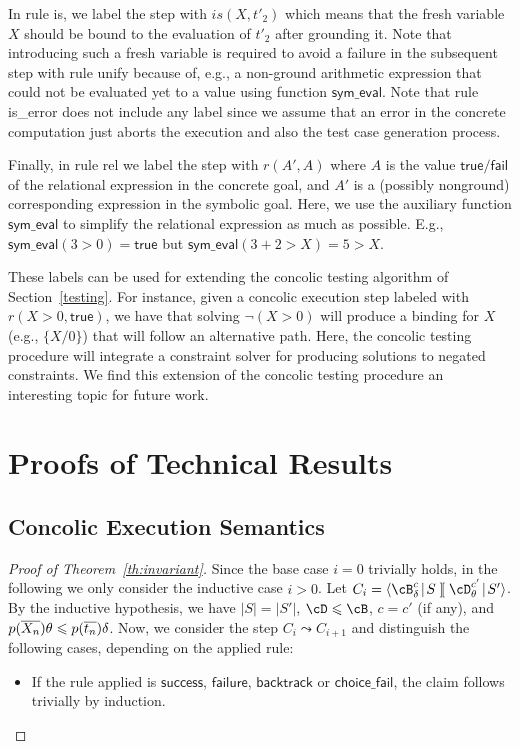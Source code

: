 \documentclass[fleqn]{tlp}
\newcommand{\sleq}{\leqslant}
\newcommand{\true}{\mathsf{true}}
\newcommand{\fail}{\mathsf{fail}}
\newcommand{\midd}{\!\mid\!}
\newcommand{\sep}{\mathit{\;]\![\;}}
\def \tuple#1{\langle #1 \rangle}
\begin{document}
\begin{appendix}
In rule \textsf{is}, we label the step with $is(X,t'_2)$ which means
that the fresh variable $X$ should be bound to the evaluation of
$t'_2$ after grounding it. Note that introducing such a fresh variable
is required to avoid a failure in the subsequent step with rule
\textsf{unify} because of, e.g., a non-ground arithmetic expression
that could not be evaluated yet to a value using function
$\mathsf{sym\_eval}$.
Note that rule \textsf{is\_error} does not include any label since we
assume that an error in the concrete computation just aborts the
execution and also the test case generation process.

Finally, in rule \textsf{rel} we label the step with $r(A',A)$ where
$A$ is the value $\true/\fail$ of the relational expression in the
concrete goal, and $A'$ is a (possibly nonground) corresponding
expression in the symbolic goal. Here, we use the auxiliary function
$\mathsf{sym\_eval}$ to simplify the relational expression as much as
possible. E.g., $\mathsf{sym\_eval}(3>0) = \true$ but
$\mathsf{sym\_eval}(3+2>X) = 5>X$.

These labels can be used for extending the concolic testing algorithm
of Section~\ref{testing}. For instance, given a concolic execution
step labeled with $r(X>0,\true)$, we have that solving $\neg(X>0)$
will produce a binding for $X$ (e.g., $\{X/0\}$) that will follow an
alternative path. Here, the concolic testing procedure will integrate
a constraint solver for producing solutions to negated constraints. We
find this extension of the concolic testing procedure an interesting
topic for future work.

\section{Proofs of Technical Results} \label{appendix:proofs}

\subsection{Concolic Execution Semantics}

\begin{proof}[Proof of Theorem~\ref{th:invariant}]
  Since the base case $i=0$ trivially holds, in the following we only
  consider the inductive case $i>0$. Let $C_i=
  \tuple{\cB^c_\delta\midd S\sep \cD^{c'}_\theta\midd S'}$. By the
  inductive hypothesis, we have $|S|=|S'|$, $\cD\sleq \cB$, $c=c'$ (if
  any), and $p(\ol{X_n})\theta \sleq p(\ol{t_n})\delta$. Now, we
  consider the step $C_i \leadsto C_{i+1}$ and distinguish the
  following cases, depending on the applied rule:
  \begin{itemize}
  \item If the rule applied is $\mathsf{success}$, $\mathsf{failure}$,
    $\mathsf{backtrack}$ or $\mathsf{choice\_fail}$, the claim follows
    trivially by induction.


\end{itemize}
\end{proof}
\end{appendix}
\end{document}
